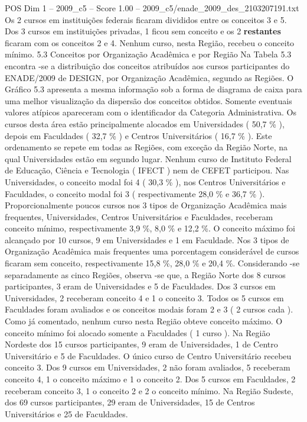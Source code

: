 \begin{textsample}{POS Dim 1 – 2009\_c5 – Score 1.00 – 2009\_c5/enade\_2009\_des\_2103207191.txt}
Os 2 cursos em instituições federais ficaram divididos entre os conceitos 3 e 5.
Dos 3 cursos em instituições privadas, 1 ficou sem conceito e os 2 \textbf{restantes} ficaram com os conceitos 2 e 4.
Nenhum curso, nesta Região, recebeu o conceito mínimo. 5.3 Conceitos por Organização Acadêmica e por Região Na Tabela 5.3 encontra -se a distribuição dos conceitos atribuídos aos cursos participantes do ENADE/2009 de DESIGN, por Organização Acadêmica, segundo as Regiões.
O Gráfico 5.3 apresenta a mesma informação sob a forma de diagrama de caixa para uma melhor visualização da dispersão dos conceitos obtidos.
Somente eventuais valores atípicos apareceram com o identificador da Categoria Administrativa.
Os cursos desta área estão principalmente alocados em Universidades ( 50,7 \% ), depois em Faculdades ( 32,7 \% ) e Centros Universitários ( 16,7 \% ).
Este ordenamento se repete em todas as Regiões, com exceção da Região Norte, na qual Universidades estão em segundo lugar.
Nenhum curso de Instituto Federal de Educação, Ciência e Tecnologia ( IFECT ) nem de CEFET participou.
Nas Universidades, o conceito modal foi 4 ( 30,3 \% ), nos Centros Universitários e Faculdades, o conceito modal foi 3 ( respectivamente 28,0 \% e 36,7 \% ).
Proporcionalmente poucos cursos nos 3 tipos de Organização Acadêmica mais frequentes, Universidades, Centros Universitários e Faculdades, receberam conceito mínimo, respectivamente 3,9 \%, 8,0 \% e 12,2 \%.
O conceito máximo foi alcançado por 10 cursos, 9 em Universidades e 1 em Faculdade.
Nos 3 tipos de Organização Acadêmica mais frequentes uma porcentagem considerável de cursos ficaram sem conceito, respectivamente 15,8 \%, 28,0 \% e 20,4 \%.
Considerando -se separadamente as cinco Regiões, observa -se que, a Região Norte dos 8 cursos participantes, 3 eram de Universidades e 5 de Faculdades.
Dos 3 cursos em Universidades, 2 receberam conceito 4 e 1 o conceito 3.
Todos os 5 cursos em Faculdades foram avaliados e os conceitos modais foram 2 e 3 ( 2 cursos cada ).
Como já comentado, nenhum curso nesta Região obteve conceito máximo.
O conceito mínimo foi alocado somente a Faculdades ( 1 curso ).
Na Região Nordeste dos 15 cursos participantes, 9 eram de Universidades, 1 de Centro Universitário e 5 de Faculdades.
O único curso de Centro Universitário recebeu conceito 3.
Dos 9 cursos em Universidades, 2 não foram avaliados, 5 receberam conceito 4, 1 o conceito máximo e 1 o conceito 2.
Dos 5 cursos em Faculdades, 2 receberam conceito 3, 1 o conceito 2 e 2 o conceito mínimo.
Na Região Sudeste, dos 69 cursos participantes, 29 eram de Universidades, 15 de Centros Universitários e 25 de Faculdades.

\end{textsample}
